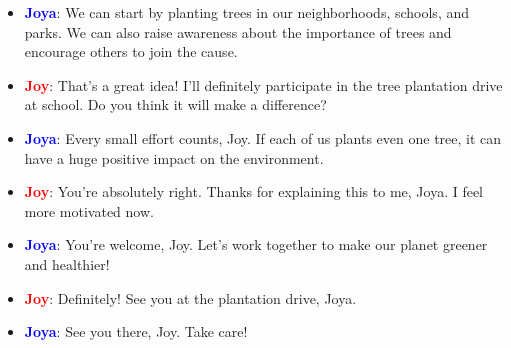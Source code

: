 \documentclass{article}
\begin{document}
\begin{itemize}
    \item \textbf{\textcolor{blue}{Joya}}: We can start by planting trees in our neighborhoods, schools, and parks. We can also raise awareness about the importance of trees and encourage others to join the cause.
    \item \textbf{\textcolor{red}{Joy}}: That’s a great idea! I’ll definitely participate in the tree plantation drive at school. Do you think it will make a difference?
    \item \textbf{\textcolor{blue}{Joya}}: Every small effort counts, Joy. If each of us plants even one tree, it can have a huge positive impact on the environment.
    \item \textbf{\textcolor{red}{Joy}}: You’re absolutely right. Thanks for explaining this to me, Joya. I feel more motivated now.
    \item \textbf{\textcolor{blue}{Joya}}: You’re welcome, Joy. Let’s work together to make our planet greener and healthier!
    \item \textbf{\textcolor{red}{Joy}}: Definitely! See you at the plantation drive, Joya.
    \item \textbf{\textcolor{blue}{Joya}}: See you there, Joy. Take care!
\end{itemize}
\end{document}
